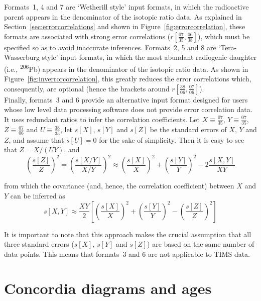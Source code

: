 \begin{refsection}
Formats~1, 4 and 7 are `Wetherill style' input formats, in which the
radioactive parent appears in the denominator of the isotopic ratio
data. As explained in Section~\ref{sec:errorcorrelations} and shown in
Figure~\ref{fig:errorcorrelation}, these formats are associated with
strong error correlations
($r\left[\frac{07}{35},\frac{06}{38}\right]$), which must be specified
so as to avoid inaccurate inferences.  Formats~2, 5 and 8 are
`Tera-Wasserburg style' input formats, in which the most abundant
radiogenic daughter (i.e., \textsuperscript{206}Pb) appears in the
denominator of the isotopic ratio data.  As shown in
Figure~\ref{fig:inverrorcorrelation}, this greatly reduces the error
correlations which, consequently, are optional (hence the brackets
around $r\left[\frac{38}{06},\frac{07}{06}\right]$).\\

Finally, formats~3 and 6 provide an alternative input format designed
for users whose low level data processing software does not provide
error correlation data. It uses redundant ratios to infer the
correlation coefficients. Let $X \equiv \frac{07}{35}$, $Y \equiv
\frac{07}{35}$, $Z \equiv \frac{07}{06}$ and $U \equiv \frac{38}{35}$,
let $s[X]$, $s[Y]$ and $s[Z]$ be the standard errors of $X$, $Y$ and
$Z$, and assume that $s[U]=0$ for the sake of simplicity. Then it is
easy to see that $Z = X/(U Y)$, and
\begin{equation}
  \left(\frac{s[Z]}{Z}\right)^2 = \left(\frac{s[X/Y]}{X/Y}\right)^2
  \approx \left(\frac{s[X]}{X}\right)^2 + \left(\frac{s[Y]}{Y}\right)^2 -
  2 \frac{s[X,Y]}{XY}
\end{equation}

\noindent from which the covariance (and, hence, the correlation
coefficient) between $X$ and $Y$ can be inferred as
\begin{equation}
  s[X,Y] \approx \frac{XY}{2}
  \left[
    \left(\frac{s[X]}{X}\right)^2 +
    \left(\frac{s[Y]}{Y}\right)^2 -
    \left(\frac{s[Z]}{Z}\right)^2
    \right]
  \label{eq:redundantratios}
\end{equation}

It is important to note that this approach makes the crucial
assumption that all three standard errors ($s[X]$, $s[Y]$ and $s[Z]$)
are based on the same number of data points. This means that formats~3
and 6 are not applicable to TIMS data.

\section{Concordia diagrams and ages}
\label{sec:concordia}


\end{refsection}
